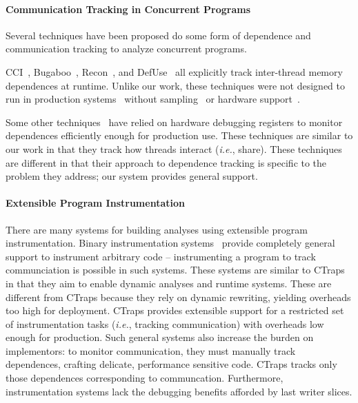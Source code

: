\documentclass[preprint,9pt]{sigplanconf}
\newcommand{\ctraps}{CTraps\xspace}
\begin{document}
\paragraph{Communication Tracking in Concurrent Programs}
Several techniques have been proposed do some form of dependence and
communication tracking to analyze concurrent programs.  

CCI~\cite{cci}, Bugaboo~\cite{bugaboo}, Recon~\cite{recon}, and
DefUse~\cite{defuse} all explicitly track inter-thread memory dependences at
runtime.  Unlike our work, these techniques were not designed to run in
production systems~\cite{recon,defuse} without sampling~\cite{cci} or hardware
support~\cite{bugaboo}.  

Some other techniques~\cite{threadclustering,threadcriticality} have relied on
hardware debugging registers to monitor dependences efficiently enough for
production use.  These techniques are similar to our work in that they track how
threads interact ({\em i.e.}, share).  These techniques are different in that
their approach to dependence tracking is specific to the problem they address;
our system provides general support.

\paragraph{Extensible Program Instrumentation}
There are many systems for building analyses using extensible program
instrumentation.  Binary instrumentation
systems~\cite{pin,dynamorio,valgrind,roadrunner} provide completely general
support to instrument arbitrary code -- instrumenting a program to track
communciation is possible in such systems.  These systems are similar to
\ctraps in that they aim to enable dynamic analyses and runtime systems.  These
are different from \ctraps because they rely on dynamic rewriting, yielding
overheads too high for deployment.  \ctraps provides extensible support for a
restricted set of instrumentation tasks ({\em i.e.}, tracking communication)
with overheads low enough for production.  Such general systems also increase
the burden on implementors: to monitor communication, they must manually track
dependences, crafting delicate, performance sensitive code.  \ctraps tracks
only those dependences corresponding to communcation.  Furthermore, 
instrumentation systems lack the debugging benefits afforded by last writer slices.
\end{document}
